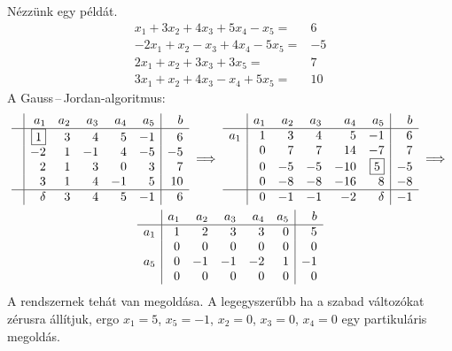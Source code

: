 \documentclass[9pt, a4paper, showtrims]{memoir}
\theoremstyle{plain}
\theoremstyle{remark}
\theoremstyle{definition}
\begin{document}
Nézzünk egy példát.
\[
	\begin{array}{rl}
		x_1+3x_2+4x_3+5x_4-x_5=  & 6  \\
		-2x_1+x_2-x_3+4x_4-5x_5= & -5 \\
		2x_1+x_2+3x_3+3x_5=      & 7  \\
		3x_1+x_2+4x_3-x_4+5x_5=  & 10
	\end{array}
\]
A Gauss\,--\,Jordan-algoritmus:
\begin{multline*}
	\begin{array}{c|rrrrr|r}
		 & a_1       & a_2 & a_3 & a_4 & a_5 & b  \\
		\hline
		 & \boxed{1} & 3   & 4   & 5   & -1  & 6  \\
		 & -2        & 1   & -1  & 4   & -5  & -5 \\
		 & 2         & 1   & 3   & 0   & 3   & 7  \\
		 & 3         & 1   & 4   & -1  & 5   & 10 \\
		\hline
		 & \delta    & 3   & 4   & 5   & -1  & 6
	\end{array}
	\implies
	\begin{array}{c|rrrrr|r}
		    & a_1 & a_2 & a_3 & a_4 & a_5       & b  \\
		\hline
		a_1 & 1   & 3   & 4   & 5   & -1        & 6  \\
		    & 0   & 7   & 7   & 14  & -7        & 7  \\
		    & 0   & -5  & -5  & -10 & \boxed{5} & -5 \\
		    & 0   & -8  & -8  & -16 & 8         & -8 \\
		\hline
		    & 0   & -1  & -1  & -2  & \delta    & -1
	\end{array}
	\implies
	\\
	\begin{array}{c|rrrrr|r}
		    & a_1 & a_2 & a_3 & a_4 & a_5 & b  \\
		\hline
		a_1 & 1   & 2   & 3   & 3   & 0   & 5  \\
		    & 0   & 0   & 0   & 0   & 0   & 0  \\
		a_5 & 0   & -1  & -1  & -2  & 1   & -1 \\
		    & 0   & 0   & 0   & 0   & 0   & 0  \\
	\end{array}
\end{multline*}
A rendszernek tehát van megoldása.
A legegyszerűbb ha a szabad változókat zérusra állítjuk,
ergo $x_1=5$, $x_5=-1$, $x_2=0$, $x_3=0$, $x_4=0$ egy partikuláris megoldás.
\end{document}
